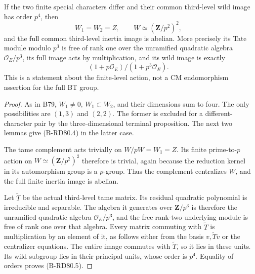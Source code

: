 \begin{theorem}
\label{thm:B-RD80}
If the two finite special characters differ and their common
third-level wild image has order \(p^4\), then
\[
 W_1=W_2=Z,
 \qquad W\simeq(\mathbf Z/p^2)^2,
                                                     \tag{B-RD80.4}
\]
and the full common third-level inertia image is abelian.
More precisely its Tate module modulo \(p^3\) is free of rank one
over the unramified quadratic algebra \(\mathcal O_E/p^3\),
its full image acts by multiplication, and its wild image is exactly
\[
                 (1+p\mathcal O_E)/(1+p^3\mathcal O_E).
                                                     \tag{B-RD80.5}
\]
This is a statement about the finite-level action, not a CM
endomorphism assertion for the full BT group.
\end{theorem}
\begin{proof}
As in B79, \(W_1\ne0\), \(W_1\subset W_2\), and their dimensions
sum to four. The only possibilities are \((1,3)\) and \((2,2)\).
The former is excluded for a different-character pair by the
three-dimensional terminal proposition. The next two lemmas give
(B-RD80.4) in the latter case.

The tame complement acts trivially on \(W/pW=W_1=Z\).
Its finite prime-to-\(p\) action on \(W\simeq(\mathbf Z/p^2)^2\)
therefore is trivial, again because the reduction kernel in its
automorphism group is a \(p\)-group. Thus the complement centralizes
\(W\), and the full finite inertia image is abelian.

Let \(\widetilde T\) be the actual third-level tame matrix.
Its residual quadratic polynomial is irreducible and separable.
The algebra it generates over \(\mathbf Z/p^3\) is therefore the
unramified quadratic algebra \(\mathcal O_E/p^3\), and the free
rank-two underlying module is free of rank one over that algebra.
Every matrix commuting with \(\widetilde T\) is multiplication
by an element of it, as follows either from the basis
\(v,\widetilde T v\) or the centralizer equations.
The entire image commutes with \(\widetilde T\), so it lies in
these units. Its wild subgroup lies in their principal units,
whose order is \(p^4\). Equality of orders proves (B-RD80.5).
\end{proof}

